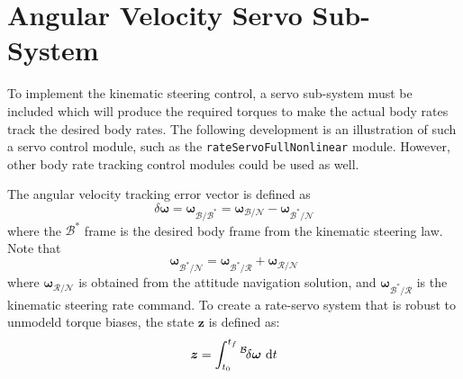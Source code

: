 \documentclass[]{BasiliskReportMemo}
\begin{document}
\section{Angular Velocity Servo Sub-System}
To implement the kinematic steering control, a servo sub-system must be included which will produce the required torques to make the actual body rates track the desired body rates.  The following development is an illustration of such a servo control module, such as the {\tt rateServoFullNonlinear} module.   However, other body rate tracking control modules could be used as well. 

The angular velocity tracking error vector is defined as
\begin{equation}
	\label{eq:MS:32}
	\delta \bm \omega = \bm\omega_{\mathcal{B}/\mathcal{B}^{\ast}} = \bm\omega_{\mathcal{B}/\mathcal{N}} - \bm\omega_{\mathcal{B}^{\ast}/\mathcal{N}}
\end{equation}
where the $\mathcal{B}^{\ast}$ frame is the desired body frame from the kinematic steering law.  Note that
\begin{equation}
	 \bm\omega_{\mathcal{B}^{\ast}/\mathcal{N}} =  \bm\omega_{\mathcal{B}^{\ast}/\mathcal{R}} +  \bm\omega_{\mathcal{R}/\mathcal{N}}
\end{equation}
where $\bm\omega_{\mathcal{R}/\mathcal{N}}$ is obtained from the attitude navigation solution, and $ \bm\omega_{\mathcal{B}^{\ast}/\mathcal{R}}$ is the kinematic steering rate command.  To create a rate-servo system that is robust to unmodeld torque biases, the state $\bm z$ is defined as:
\begin{equation}
	\label{eq:MS:34}
	\bm z = \int_{t_{0}}^{t_{f}} \leftexp{B}{ \delta\bm\omega}\ \D t
\end{equation}
\end{document}
